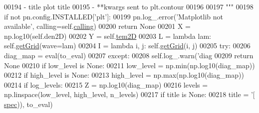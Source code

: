 \begin{DoxyCode}
00194 \textcolor{stringliteral}{            - title                     plot title}
00195 \textcolor{stringliteral}{            - **kwargs                  sent to plt.contour}
00196 \textcolor{stringliteral}{            }
00197 \textcolor{stringliteral}{        """} 
00198         \textcolor{keywordflow}{if} \textcolor{keywordflow}{not} pn.config.INSTALLED[\textcolor{stringliteral}{'plt'}]:
00199             pn.log\_.error(\textcolor{stringliteral}{'Matplotlib not available'}, calling=self.\hyperlink{classpyneb_1_1core_1_1emis_grid_1_1_emis_grid_a19820878261ee98513e0b755e688453f}{calling})
00200             \textcolor{keywordflow}{return} \textcolor{keywordtype}{None}
00201         X = np.log10(self.den2D)
00202         Y = self.\hyperlink{classpyneb_1_1core_1_1emis_grid_1_1_emis_grid_ae1904aecb62ca67772b3998cca09fabd}{tem2D}
00203         L = \textcolor{keyword}{lambda} lam: self.\hyperlink{classpyneb_1_1core_1_1emis_grid_1_1_emis_grid_af9a9219e5ddfcfd53c52466e2c2deb44}{getGrid}(wave=lam)
00204         I = \textcolor{keyword}{lambda} i, j: self.\hyperlink{classpyneb_1_1core_1_1emis_grid_1_1_emis_grid_af9a9219e5ddfcfd53c52466e2c2deb44}{getGrid}(i, j)
00205         \textcolor{keywordflow}{try}:
00206             diag\_map = eval(to\_eval)
00207         \textcolor{keywordflow}{except}:
00208             self.log\_.warn(\textcolor{stringliteral}{'diag %
00209             \textcolor{keywordflow}{return} \textcolor{keywordtype}{None}
00210         \textcolor{keywordflow}{if} low\_level \textcolor{keywordflow}{is} \textcolor{keywordtype}{None}:
00211             low\_level = np.min(np.log10(diag\_map))
00212         \textcolor{keywordflow}{if} high\_level \textcolor{keywordflow}{is} \textcolor{keywordtype}{None}:
00213             high\_level = np.max(np.log10(diag\_map))
00214         \textcolor{keywordflow}{if} log\_levels:
00215             Z = np.log10(diag\_map)
00216             levels = np.linspace(low\_level, high\_level, n\_levels)
00217             \textcolor{keywordflow}{if} title \textcolor{keywordflow}{is} \textcolor{keywordtype}{None}:
00218                 title = \textcolor{stringliteral}{'[%
      \hyperlink{classpyneb_1_1core_1_1emis_grid_1_1_emis_grid_a78618aff86ea296ecefddcc86d98b687}{spec})), to\_eval)
}}
\end{DoxyCode}
